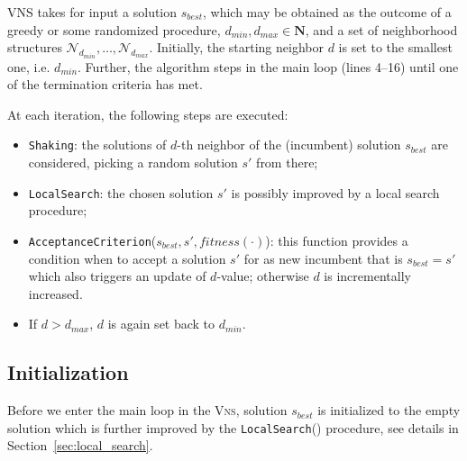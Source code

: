 \documentclass[dvipsnames,format=sigconf,anonymous=true,review=true]{acmart}
\begin{document}
 VNS takes for input a solution $s_{best}$, which may be obtained as the outcome of a greedy or some randomized procedure, $d_{min}, d_{max} \in \mathbf{N}$, 
  and a set of neighborhood structures $\mathcal{N}_{d_{min}}, \ldots, \mathcal{N}_{d_{max}}$.  
  Initially, the starting neighbor $d$ is set to the smallest one, i.e. $d_{min}$. Further, the algorithm steps in the main loop (lines 4--16) until one of the termination criteria has met.
 
   At each iteration, the following steps are executed: %
  
  \begin{itemize}
  	\item \texttt{Shaking}: the solutions of $d$-th neighbor of the (incumbent) solution $s_{best}$ are considered, picking a random solution $s'$ from there;
  	\item  \texttt{LocalSearch}: the chosen solution $s'$ is possibly improved by a local search procedure;
  	\item \texttt{AcceptanceCriterion}($s_{best}, s', fitness(\cdot)$):  this function provides a condition when to accept a solution $s'$ for as new incumbent that is $s_{best} = s'$ which also triggers an update of $d$-value; otherwise $d$ is incrementally increased. 
  	\item  If $d> d_{max}$, $d$ is again set back to $d_{min}$.
   \end{itemize}
    
    \subsection{Initialization}
      Before we enter the main loop in the \textsc{Vns}, solution $s_{best}$ is initialized to the empty solution    which is further improved by the \texttt{LocalSearch}() procedure, see details in Section~\ref{sec:local_search}. 
 
\end{document}
